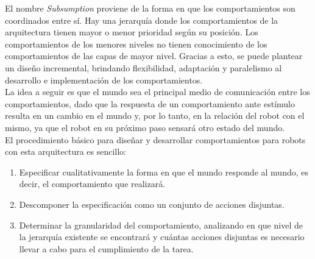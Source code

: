 El nombre \emph{Subsumption} proviene de la forma en que los comportamientos
son coordinados entre s\'i. Hay una jerarqu\'ia donde los comportamientos de la
arquitectura tienen mayor o menor prioridad seg\'un su posici\'on. Los
comportamientos de los menores niveles no tienen conocimiento de los
comportamientos de las capas de mayor nivel. Gracias a esto, se puede plantear
un dise\~no incremental, brindando flexibilidad, adaptaci\'on y paralelismo
al desarrollo e implementaci\'on de los comportamientos.
\\
La idea a seguir es que el mundo sea el principal medio de comunicaci\'on entre
los comportamientos, dado que la respuesta de un comportamiento ante est\'imulo
resulta en un cambio en el mundo y, por lo tanto, en la relaci\'on del robot
con el mismo, ya que el robot en su pr\'oximo paso sensar\'a otro estado del
mundo.
\\
El procedimiento b\'asico para dise\~nar y desarrollar comportamientos para
robots con esta arquitectura es sencillo:
\begin{enumerate}
\item Especificar cualitativamente la forma en que el mundo responde al mundo,
es decir, el comportamiento que realizar\'a.
\item Descomponer la especificaci\'on como un conjunto de acciones disjuntas.
\item Determinar la granularidad del comportamiento, analizando en que nivel de
la jerarqu\'ia existente se encontrar\'a y cu\'antas acciones disjuntas es
necesario llevar a cabo para el cumplimiento de
la tarea.
\end{enumerate}


